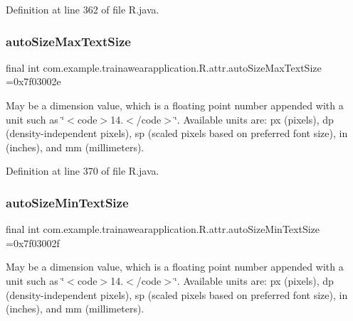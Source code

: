 Definition at line 362 of file R.\+java.

\mbox{\label{classcom_1_1example_1_1trainawearapplication_1_1_r_1_1attr_ad49137810b63d6bc3fc64e9936858323}} 
\subsubsection{\texorpdfstring{autoSizeMaxTextSize}{autoSizeMaxTextSize}}
{\footnotesize\ttfamily final int com.\+example.\+trainawearapplication.\+R.\+attr.\+auto\+Size\+Max\+Text\+Size =0x7f03002e\hspace{0.3cm}{\ttfamily [static]}}

May be a dimension value, which is a floating point number appended with a unit such as \char`\"{}$<$code$>$14.\+5sp$<$/code$>$\char`\"{}. Available units are\+: px (pixels), dp (density-\/independent pixels), sp (scaled pixels based on preferred font size), in (inches), and mm (millimeters). 

Definition at line 370 of file R.\+java.

\mbox{\label{classcom_1_1example_1_1trainawearapplication_1_1_r_1_1attr_ac84090fd3636d659f5b4cd2a36467370}} 
\subsubsection{\texorpdfstring{autoSizeMinTextSize}{autoSizeMinTextSize}}
{\footnotesize\ttfamily final int com.\+example.\+trainawearapplication.\+R.\+attr.\+auto\+Size\+Min\+Text\+Size =0x7f03002f\hspace{0.3cm}{\ttfamily [static]}}

May be a dimension value, which is a floating point number appended with a unit such as \char`\"{}$<$code$>$14.\+5sp$<$/code$>$\char`\"{}. Available units are\+: px (pixels), dp (density-\/independent pixels), sp (scaled pixels based on preferred font size), in (inches), and mm (millimeters). 

